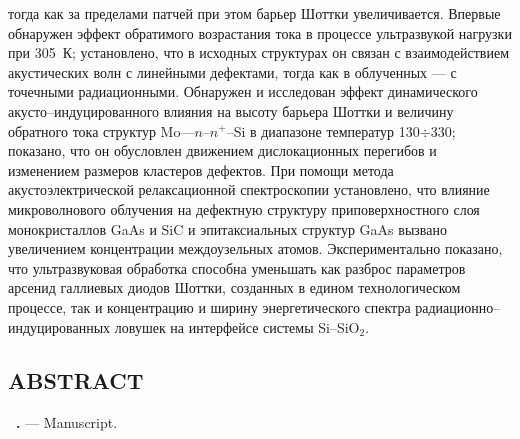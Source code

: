  тогда как за пределами патчей при этом барьер Шоттки увеличивается.
 Впервые обнаружен эффект обратимого возрастания тока в процессе ультразвукой нагрузки при 305~К;
 установлено, что в исходных структурах он связан с взаимодействием акустических волн с линейными дефектами, тогда как в облученных --- с точечными радиационными.
  Обнаружен и исследован эффект динамического акусто--индуцированного влияния на высоту барьера Шоттки и величину обратного тока структур Mo---$n$--$n^+$--Si 
 в диапазоне температур 130$\div$330;
 показано, что он обусловлен движением дислокационных перегибов и изменением размеров кластеров дефектов.
 При помощи метода акустоэлектрической релаксационной спектроскопии установлено,
 что влияние микроволнового облучения на дефектную структуру приповерхностного слоя монокристаллов GaAs и SiC и эпитаксиальных структур GaAs вызвано увеличением концентрации междоузельных атомов.
 Экспериментально показано, что ультразвуковая обработка способна уменьшать как разброс параметров арсенид галлиевых диодов Шоттки, созданных в едином технологическом процессе, так и концентрацию и ширину энергетического спектра радиационно--индуцированных ловушек на интерфейсе системы Si--SiO$_2$.


\keywordsRu


\begin{center}
{\section*{\MakeUppercase{ABSTRACT}}}
\end{center}

\vspace{-1.5em}

\textbf{\thesisAuthorFIOen~\thesisTitleEn.} ---  Manuscript.

\abstractBeginEn


